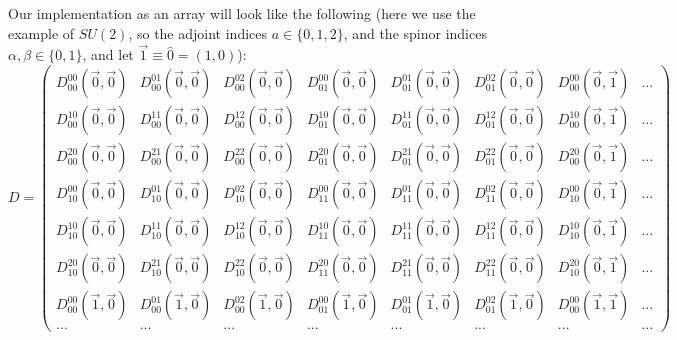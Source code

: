 Our implementation as an array will look like the following (here we use the example of $SU(2)$, so the adjoint indices $a\in \{0, 1, 2\}$, and the spinor indices $\alpha, \beta\in \{0, 1\}$, and let $\vec 1\equiv \hat 0 = (1, 0)$):
\begin{equation}
	D = 
	\begin{pmatrix} 
		D_{00}^{00}(\vec 0, \vec 0) & D_{00}^{01}(\vec 0, \vec 0) & D_{00}^{02}(\vec 0, \vec 0) & D_{01}^{00}(\vec 0, \vec 0) & D_{01}^{01}(\vec 0, \vec 0) & D_{01}^{02}(\vec 0, \vec 0) & D_{00}^{00}(\vec 0, \vec 1) & ... \\
		
		D_{00}^{10}(\vec 0, \vec 0) & D_{00}^{11}(\vec 0, \vec 0) & D_{00}^{12}(\vec 0, \vec 0) & D_{01}^{10}(\vec 0, \vec 0) & D_{01}^{11}(\vec 0, \vec 0) & D_{01}^{12}(\vec 0, \vec 0) & D_{00}^{10}(\vec 0, \vec 1) & ... \\
		
		D_{00}^{20}(\vec 0, \vec 0) & D_{00}^{21}(\vec 0, \vec 0) & D_{00}^{22}(\vec 0, \vec 0) & D_{01}^{20}(\vec 0, \vec 0) & D_{01}^{21}(\vec 0, \vec 0) & D_{01}^{22}(\vec 0, \vec 0) & D_{00}^{20}(\vec 0, \vec 1) & ... \\
		
		D_{10}^{00}(\vec 0, \vec 0) & D_{10}^{01}(\vec 0, \vec 0) & D_{10}^{02}(\vec 0, \vec 0) & D_{11}^{00}(\vec 0, \vec 0) & D_{11}^{01}(\vec 0, \vec 0) & D_{11}^{02}(\vec 0, \vec 0) & D_{10}^{00}(\vec 0, \vec 1) & ... \\
		
		D_{10}^{10}(\vec 0, \vec 0) & D_{10}^{11}(\vec 0, \vec 0) & D_{10}^{12}(\vec 0, \vec 0) & D_{11}^{10}(\vec 0, \vec 0) & D_{11}^{11}(\vec 0, \vec 0) & D_{11}^{12}(\vec 0, \vec 0) & D_{10}^{10}(\vec 0, \vec 1) & ... \\
		
		D_{10}^{20}(\vec 0, \vec 0) & D_{10}^{21}(\vec 0, \vec 0) & D_{10}^{22}(\vec 0, \vec 0) & D_{11}^{20}(\vec 0, \vec 0) & D_{11}^{21}(\vec 0, \vec 0) & D_{11}^{22}(\vec 0, \vec 0) & D_{10}^{20}(\vec 0, \vec 1) & ... \\
		
		D_{00}^{00}(\vec 1, \vec 0) & D_{00}^{01}(\vec 1, \vec 0) & D_{00}^{02}(\vec 1, \vec 0) & D_{01}^{00}(\vec 1, \vec 0) & D_{01}^{01}(\vec 1, \vec 0) & D_{01}^{02}(\vec 1, \vec 0) & D_{00}^{00}(\vec 1, \vec 1) & ... \\
		... & ... & ... & ... & ... & ... & ... & ...
	\end{pmatrix}
	\label{eq:dirac_op_indexing}
\end{equation}
